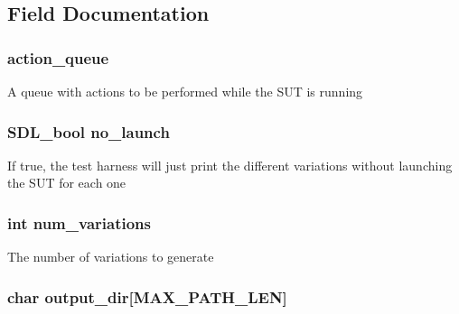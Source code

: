 \subsection{Field Documentation}
\hypertarget{struct_s_d_l_visual_test___harness_state_ae25567527563fbd7373fa1cf7cdede61}{
\subsubsection[{action\-\_\-queue}]{ action\-\_\-queue}}\label{struct_s_d_l_visual_test___harness_state_ae25567527563fbd7373fa1cf7cdede61}
A queue with actions to be performed while the S\-U\-T is running \hypertarget{struct_s_d_l_visual_test___harness_state_a091c0d08290b73216a736ff42ac8fa99}{
\subsubsection[{no\-\_\-launch}]{\setlength{\rightskip}{0pt plus 5cm}S\-D\-L\-\_\-bool no\-\_\-launch}}\label{struct_s_d_l_visual_test___harness_state_a091c0d08290b73216a736ff42ac8fa99}
If true, the test harness will just print the different variations without launching the S\-U\-T for each one \hypertarget{struct_s_d_l_visual_test___harness_state_a0bd4e04c0c6be7b94e68501bb31dd62c}{
\subsubsection[{num\-\_\-variations}]{\setlength{\rightskip}{0pt plus 5cm}int num\-\_\-variations}}\label{struct_s_d_l_visual_test___harness_state_a0bd4e04c0c6be7b94e68501bb31dd62c}
The number of variations to generate \hypertarget{struct_s_d_l_visual_test___harness_state_aafa9a2fb15490380b6c2edd704f4fcf0}{
\subsubsection[{output\-\_\-dir}]{\setlength{\rightskip}{0pt plus 5cm}char output\-\_\-dir\mbox{[}{\bf M\-A\-X\-\_\-\-P\-A\-T\-H\-\_\-\-L\-E\-N}\mbox{]}}}\label{struct_s_d_l_visual_test___harness_state_aafa9a2fb15490380b6c2edd704f4fcf0}

